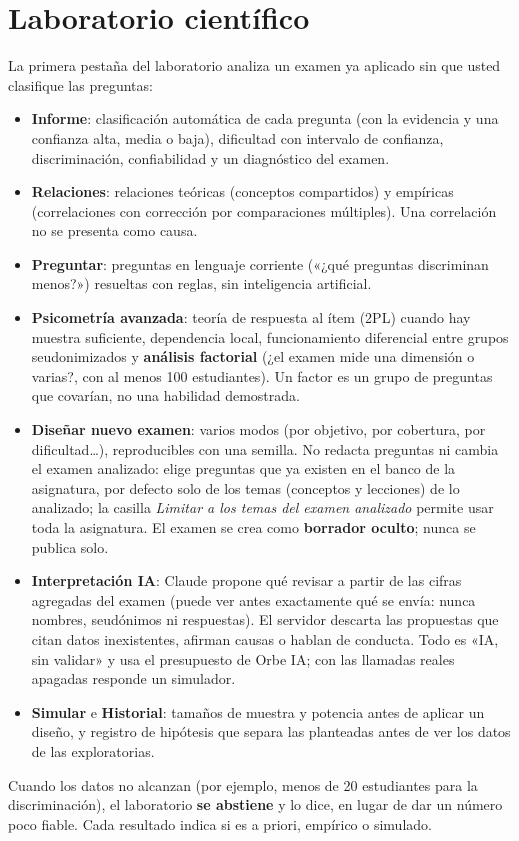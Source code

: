 \documentclass[11pt,a4paper,oneside]{book}
\begin{document}
\section{Laboratorio científico}
La primera pestaña del laboratorio analiza un examen ya aplicado sin que usted clasifique las preguntas:
\begin{itemize}
  \item \textbf{Informe}: clasificación automática de cada pregunta (con la evidencia y una confianza alta, media o
        baja), dificultad con intervalo de confianza, discriminación, confiabilidad y un diagnóstico del examen.
  \item \textbf{Relaciones}: relaciones teóricas (conceptos compartidos) y empíricas (correlaciones con corrección por
        comparaciones múltiples). Una correlación no se presenta como causa.
  \item \textbf{Preguntar}: preguntas en lenguaje corriente («¿qué preguntas discriminan menos?») resueltas con reglas,
        sin inteligencia artificial.
  \item \textbf{Psicometría avanzada}: teoría de respuesta al ítem (2PL) cuando hay muestra suficiente, dependencia
        local, funcionamiento diferencial entre grupos seudonimizados y \textbf{análisis factorial} (¿el examen mide
        una dimensión o varias?, con al menos 100 estudiantes). Un factor es un grupo de preguntas que covarían, no una
        habilidad demostrada.
  \item \textbf{Diseñar nuevo examen}: varios modos (por objetivo, por cobertura, por dificultad\ldots), reproducibles
        con una semilla. No redacta preguntas ni cambia el examen analizado: elige preguntas que ya existen en el banco
        de la asignatura, por defecto solo de los temas (conceptos y lecciones) de lo analizado; la casilla
        \emph{Limitar a los temas del examen analizado} permite usar toda la asignatura. El examen se crea como
        \textbf{borrador oculto}; nunca se publica solo.
  \item \textbf{Interpretación IA}: Claude propone qué revisar a partir de las cifras agregadas del examen (puede ver
        antes exactamente qué se envía: nunca nombres, seudónimos ni respuestas). El servidor descarta las propuestas
        que citan datos inexistentes, afirman causas o hablan de conducta. Todo es «IA, sin validar» y usa el
        presupuesto de Orbe IA; con las llamadas reales apagadas responde un simulador.
  \item \textbf{Simular} e \textbf{Historial}: tamaños de muestra y potencia antes de aplicar un diseño, y registro de
        hipótesis que separa las planteadas antes de ver los datos de las exploratorias.
\end{itemize}
Cuando los datos no alcanzan (por ejemplo, menos de 20 estudiantes para la discriminación), el laboratorio
\textbf{se abstiene} y lo dice, en lugar de dar un número poco fiable. Cada resultado indica si es a priori, empírico o
simulado.
\end{document}
